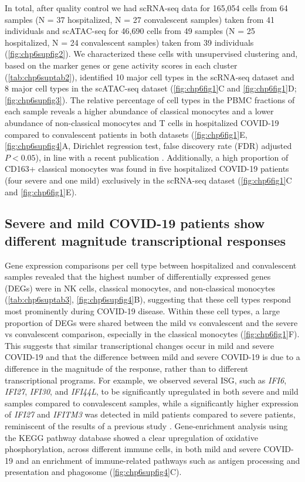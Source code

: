 \documentclass{book}
\begin{document}
\begin{refsection}
In total, after quality control we had scRNA-seq data for 165,054 cells from 64 samples (N = 37 hospitalized, N = 27 convalescent samples) taken from 41 individuals and scATAC-seq for 46,690 cells from 49 samples (N = 25 hospitalized, N = 24 convalescent samples) taken from 39 individuals (\ref{fig:chp6supfig2}).
We characterized these cells with unsupervised clustering and, based on the marker genes or gene activity scores in each cluster (\ref{tab:chp6suptab2}), identified 10 major cell types in the scRNA-seq dataset and 8 major cell types in the scATAC-seq dataset (\ref{fig:chp6fig1}C and \ref{fig:chp6fig1}D; \ref{fig:chp6supfig3}).
The relative percentage of cell types in the PBMC fractions of each sample reveals a higher abundance of classical monocytes and a lower abundance of non-classical monocytes and T cells in hospitalized COVID-19 compared to convalescent patients in both datasets (\ref{fig:chp6fig1}E, \ref{fig:chp6supfig4}A, Dirichlet regression test, false discovery rate (FDR) adjusted $P < 0.05$), in line with a recent publication \cite{Patterson2021Persistence}.
Additionally, a high proportion of CD163+ classical monocytes was found in five hospitalized COVID-19 patients (four severe and one mild) exclusively in the scRNA-seq dataset (\ref{fig:chp6fig1}C and \ref{fig:chp6fig1}E).

\subsection*{Severe and mild COVID-19 patients show different magnitude transcriptional responses}
Gene expression comparisons per cell type between hospitalized and convalescent samples revealed that the highest number of differentially expressed genes (DEGs) were in NK cells, classical monocytes, and non-classical monocytes (\ref{tab:chp6suptab3}, \ref{fig:chp6supfig4}B), suggesting that these cell types respond most prominently during COVID-19 disease.
Within these cell types, a large proportion of DEGs were shared between the mild vs convalescent and the severe vs convalescent comparison, especially in the classical monocytes (\ref{fig:chp6fig1}F).
This suggests that similar transcriptional changes occur in mild and severe COVID-19 and that the difference between mild and severe COVID-19 is due to a difference in the magnitude of the response, rather than to different transcriptional programs.
For example, we observed several ISG, such as \textit{IFI6}, \textit{IFI27}, \textit{IFI30}, and \textit{IFI44L}, to be significantly upregulated in both severe and mild samples compared to convalescent samples, while a significantly higher expression of \textit{IFI27} and \textit{IFITM3} was detected in mild patients compared to severe patients, reminiscent of the results of a previous study \cite{Schulte2020Severe}.
Gene-enrichment analysis using the KEGG pathway database showed a clear upregulation of oxidative phosphorylation, across different immune cells, in both mild and severe COVID-19 and an enrichment of immune-related pathways such as antigen processing and presentation and phagosome (\ref{fig:chp6supfig4}C).
\vfill


\end{refsection}
\end{document}
